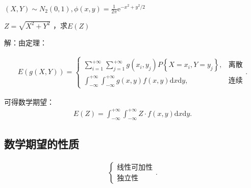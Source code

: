 \begin{eg}
    $(X,Y)\sim N_2\left( 0,1 \right) ,\phi\left( x,y \right) =\frac{1}{2\pi}\mathrm{e}^{-x^2+y^2 /2}$

    $Z=\sqrt{X^2+Y^2} $ ，求$E\left( Z \right) $
\end{eg}
解：由定理：
\begin{rrule}
    \begin{align*}
        E\left( g\left( X,Y \right)  \right) =\begin{cases}
            {\sum_{i=1}^{+\infty}{\sum_{j=1}^{+\infty} g\left( x_{i},y_{j} \right) P\left\{ X=x_{i},Y=y_{j} \right\}} },&\text{离散}\\
            {\int_{-\infty}^{+\infty}{\int_{-\infty}^{+\infty} g\left( x,y \right) f\left( x,y \right)  \mathrm{d}x} \mathrm{d}y},&\text{连续}
        \end{cases}
    .\end{align*}
\end{rrule}
可得数学期望：
\begin{align*}
    E\left( Z \right) =\int_{-\infty}^{+\infty} \int_{-\infty}^{+\infty} Z\cdot f\left( x,y \right)  \mathrm{d}x \mathrm{d}y
.\end{align*}
\subsection{数学期望的性质}%
\label{sub:数学期望的性质}
\begin{align*}
    \begin{cases}
        \text{线性可加性}\\
        \text{独立性}
    \end{cases}
.\end{align*}

